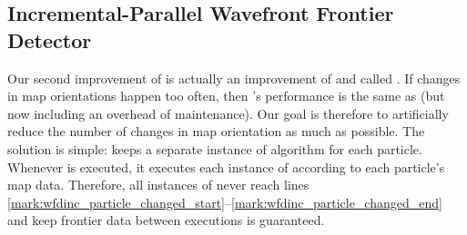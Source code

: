\subsection{Incremental-Parallel Wavefront Frontier Detector}
\label{section:wfd_incremental_parallel}
Our second improvement of \WFD is actually an improvement of \WFDINC and called
\WFDIP. If changes in map orientations happen too often, then \WFDINC's
performance is the same as \WFD (but now including an overhead of maintenance).
Our goal is therefore to artificially reduce the number of changes in map
orientation as much as possible. The solution is simple: \WFDIP keeps a separate
instance of \WFDINC algorithm for each particle. Whenever \WFDIP is executed, it executes
each instance of \WFDINC according to each particle's map data. Therefore, all
instances of \WFDINC never reach lines
\ref{mark:wfdinc_particle_changed_start}--\ref{mark:wfdinc_particle_changed_end}
and keep frontier data between executions is guaranteed. 

